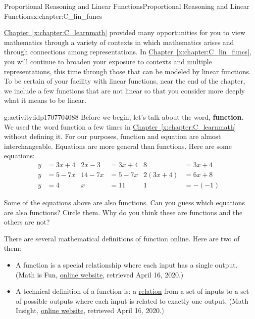 \documentclass[oneside,10pt,]{book}
\newcommand{\xreffont}{\relax}
\newcommand{\terminology}[1]{\textbf{#1}}
\numberwithin{equation}{chapter}
\newcommand{\amp}{&}
\begin{document}
\typeout{************************************************}
%
\begin{chapterptx}{Proportional Reasoning and Linear Functions}{}{Proportional Reasoning and Linear Functions}{}{}{x:chapter:C_lin_funcs}
\begin{introduction}{}%
\hyperref[x:chapter:C_learnmath]{Chapter~{\xreffont\ref{x:chapter:C_learnmath}}} provided many opportunities for you to view mathematics through a variety of contexts in which mathematics arises and through connections among representations. In \hyperref[x:chapter:C_lin_funcs]{Chapter~{\xreffont\ref{x:chapter:C_lin_funcs}}}, you will continue to broaden your exposure to contexts and multiple representations, this time through those that can be modeled by linear functions. To be certain of your facility with linear functions, near the end of the chapter, we include a few functions that are not linear so that you consider more deeply what it means to be linear.%
\begin{activity}{}{g:activity:idp1707704088}%
Before we begin, let's talk about the word, \terminology{function}. We used the word function a few times in \hyperref[x:chapter:C_learnmath]{Chapter~{\xreffont\ref{x:chapter:C_learnmath}}} without defining it. For our purposes, function and equation are almost interchangeable. Equations are more general than functions. Here are some equations:%
\begin{align*}
y \amp = 3x + 4 \amp 2x - 3 \amp = 3x + 4 \amp 8 \amp = 3x + 4\\
y \amp = 5 - 7x \amp 14 - 7x \amp = 5 - 7x \amp 2(3x + 4) \amp = 6x + 8\\
y \amp = 4 \amp x \amp = 11 \amp 1 \amp = - (-1)
\end{align*}
%
\par
Some of the equations above are also functions. Can you guess which equations are also functions? Circle them. Why do you think these are functions and the others are not?%
\par
There are several mathematical definitions of function online. Here are two of them:%
\begin{itemize}[label=\textbullet]
\item{}A function is a special relationship where each input has a single output. (Math is Fun, \href{https://www.mathsisfun.com/definitions/function.html}{online website}\footnotemark{}, retrieved April 16, 2020.)%
\item{}A technical definition of a function is: a \href{http://mathinsight.org/definition/relation}{relation}\footnotemark{} from a set of inputs to a set of possible outputs where each input is related to exactly one output. (Math Insight, \href{http://mathinsight.org/definition/function}{online website}\footnotemark{}, retrieved April 16, 2020.)%

\end{itemize}
\end{activity}
\end{introduction}
\end{chapterptx}
\end{document}

